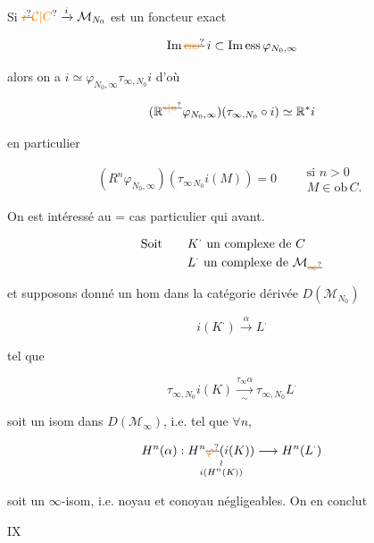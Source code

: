 Si $\deleted{\unsure{i}}\unsure{\mathcal C|C}\xrightarrow{i}\mathcal M_{N_0}$ est un foncteur exact

\[
\operatorname{Im}\deleted{\unsure{\mathrm{ess}}}\,i\subset\operatorname{Im\,ess}\varphi_{N_0,\infty}
\]

alors on a $i\simeq\varphi_{N_0,\infty}\tau_{\infty,N_0}i$ d'où

\[
(\mathbb R^{\deleted{\unsure{*|n}}}\varphi_{N_0,\infty})(\tau_{\infty,N_0}\circ i)\simeq\mathbb R^*i
\]

en particulier

\[
(R^n\varphi_{N_0,\infty})(\tau_{\infty\,N_0}i(M))=0
\qquad\begin{gathered}\text{si }n>0\\ M\in\mathrm{ob}\,C.\end{gathered}
\]

On est intéressé au = cas particulier qui avant.


\[
\begin{aligned}
\text{Soit}\qquad &K^\cdot\text{ un complexe de }C\\
&L^\cdot\text{ un complexe de }\mathcal M_{\deleted{\unsure{\infty}}}
\end{aligned}
\]

et supposons donné un hom dans la catégorie dérivée $D(\mathcal M_{N_0})$

\[
i(K^\cdot)\xrightarrow{\alpha}L^\cdot
\]

tel que

\[
\tau_{\infty,N_0}i(K)\xrightarrow[\sim]{\tau_\infty\alpha}\tau_{\infty,N_0}L^\cdot
\]

soit un isom dans $D(\mathcal M_\infty)$, i.e. tel que $\forall n$,

\[
H^n(\alpha):\underset{\substack{\wr\\ i(H^n(K))}}{H^{n}\deleted{\unsure{\varphi}}(i(K))}\longrightarrow H^n(L^\cdot)
\]

soit un $\infty$-isom, i.e. noyau et conoyau  négligeables. On en conclut


\hfill IX

